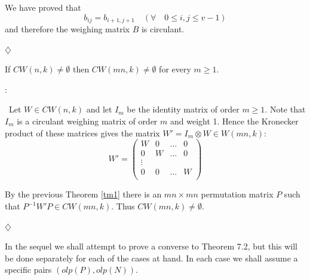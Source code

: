 {{{\begin{pr}
{ We have proved that
     $$ b_{ij}=b_{i+1,j+1} \quad (\forall \quad  0 \leq i,j \leq v-1)$$ 
 and therefore the weighing matrix $B$ is circulant.  
		   \begin{flushright}
				$\diamondsuit$
			  \end{flushright}
}
\end{pr}
    
    
\begin{thm} \label{theor1}
       If $CW(n,k) \neq \emptyset$ then $CW(mn,k) \neq \emptyset$ for every $m \geq 1$.
\end{thm}
\begin{pr}:{\rm
	\ Let $W \in CW(n,k)$ and let $I_m$ be the identity matrix of order $m \geq 1$.
	Note that $I_m$ is a circulant weighing matrix of order $m$ and 
	weight 1.
	Hence the Kronecker product of these matrices gives the matrix
	$W'=I_m \otimes W \in W(mn,k)$: 
	\[ W'= \left( \begin{array}{cccc}
	W  & 0 & \ldots & 0  \\
	0  & W & \ldots & 0  \\            
	\vdots  \\
	0  & 0 & \ldots & W  \\
	       \end{array}      \right)   \]

	By the previous Theorem \ref{tm1} there is an $mn \times mn$ 
	permutation matrix $P$ such that $P^{-1}W'P \in CW(mn,k)$. 
	Thus $CW(mn,k) \neq \emptyset$.
		   
		   \begin{flushright}
				$\diamondsuit$
		   \end{flushright}
     
     }
\end{pr}

In the sequel we shall attempt to prove a converse to Theorem 7.2, but this 
will be done separately for each of the cases at hand. In each case we shall 
assume a specific pairs $(olp(P),olp(N))$. 




}}}
